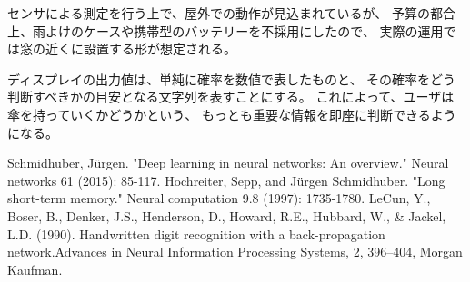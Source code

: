 \documentclass{jsarticle}
\begin{document}
			センサによる測定を行う上で、屋外での動作が見込まれているが、
			予算の都合上、雨よけのケースや携帯型のバッテリーを不採用にしたので、
			実際の運用では窓の近くに設置する形が想定される。
			
			ディスプレイの出力値は、単純に確率を数値で表したものと、
			その確率をどう判断すべきかの目安となる文字列を表すことにする。
			これによって、ユーザは傘を持っていくかどうかという、
			もっとも重要な情報を即座に判断できるようになる。
	
	\begin{thebibliography}{9}
	   Schmidhuber, Jürgen. "Deep learning in neural networks: An overview." Neural networks 61 (2015): 85-117.
	   Hochreiter, Sepp, and Jürgen Schmidhuber. "Long short-term memory." Neural computation 9.8 (1997): 1735-1780.
	   LeCun, Y., Boser, B., Denker, J.S., Henderson, D., Howard, R.E., Hubbard, W., \& Jackel, L.D. (1990). Handwritten digit recognition with a back-propagation network.Advances in Neural Information Processing Systems, 2, 396–404, Morgan Kaufman.
	\end{thebibliography}
		
\end{document}
